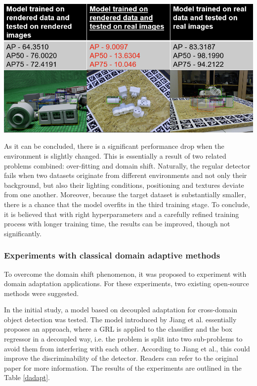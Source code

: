 \documentclass[english, 12pt, a4paper, elec, utf8, a-1b, online]{aaltothesis}
\begin{document}
\begin{table}[htb]
	\begin{center}
		\includegraphics[width=14cm]{./initialExp.png}
	\end{center}
	\begin{center}
		\label{faster_init}
	\end{center}
\end{table}
\FloatBarrier

As it can be concluded, there is a significant performance drop when the environment is slightly changed. This is essentially a result of two related problems combined: over-fitting and domain shift. Naturally, the regular detector fails when two datasets originate from different environments and not only their background, but also their lighting conditions, positioning and textures deviate from one another. Moreover, because the target dataset is substantially smaller, there is a chance that the model overfits in the third training stage. To conclude, it is believed that with right hyperparameters and a carefully refined training  process with longer training time, the results can be improved, though not significantly. 

\subsubsection{Experiments with classical domain adaptive methods}
To overcome the domain shift phenomenon, it was proposed to experiment with domain adaptation applications. For these experiments, two existing open-source methods were suggested. 

In the initial study, a model based on decoupled adaptation for cross-domain object detection \cite{Jiang2021} was tested. The model introduced by Jiang et al. essentially proposes an  approach, where a GRL is applied to the classifier and the box regressor in a decoupled way, i.e. the problem is split into two sub-problems to avoid them from interfering with each other. According to Jiang et al., this could improve the discriminability of the detector. Readers can refer to the original paper \cite{Jiang2021} for more information. The results of the experiments are outlined in the Table \ref{dadapt}.
\end{document}
